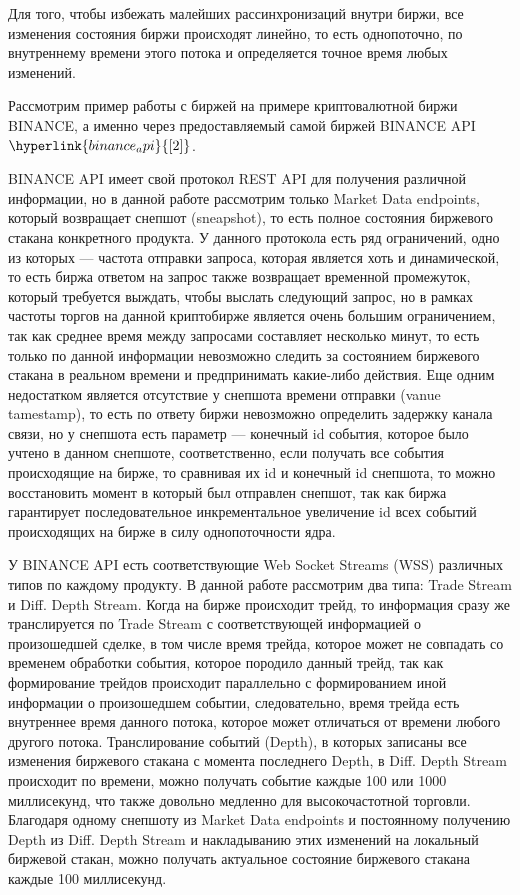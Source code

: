 \documentclass[12pt, a4paper]{article}
\begin{document}
Для того, чтобы избежать малейших рассинхронизаций внутри биржи, все изменения состояния биржи происходят линейно, то есть однопоточно, по внутреннему времени этого потока и определяется точное время любых изменений.

Рассмотрим пример работы с биржей на примере криптовалютной биржи \\ BINANCE, а именно через предоставляемый самой биржей BINANCE API $\hyperlink{binance_api}{[2]}$. 

BINANCE API имеет свой протокол REST API для получения различной информации, но в данной работе рассмотрим только Market Data endpoints, который возвращает снепшот (sneapshot), то есть полное состояния биржевого стакана конкретного продукта. У данного протокола есть ряд ограничений, одно из которых --- частота отправки запроса, которая является хоть и динамической, то есть биржа ответом на запрос также возвращает временной промежуток, который требуется выждать, чтобы выслать следующий запрос, но в рамках частоты торгов на данной криптобирже является очень большим ограничением, так как среднее время между запросами составляет несколько минут, то есть только по данной информации невозможно следить за состоянием биржевого стакана в реальном времени и предпринимать какие-либо действия. Еще одним недостатком является отсутствие у снепшота времени отправки (vanue tamestamp), то есть по ответу биржи невозможно определить задержку канала связи, но у снепшота есть параметр --- конечный id события, которое было учтено в данном снепшоте, соответственно, если получать все события происходящие на бирже, то сравнивая их id и конечный id снепшота, то можно восстановить момент в который был отправлен снепшот, так как биржа гарантирует последовательное инкрементальное увеличение id всех событий происходящих на бирже в силу однопоточности ядра.

У BINANCE API есть соответствующие Web Socket Streams (WSS) различных типов по каждому продукту. В данной работе рассмотрим два типа: Trade Stream и Diff. Depth Stream. Когда на бирже происходит трейд, то информация сразу же транслируется по Trade Stream с соответствующей информацией о произошедшей сделке, в том числе время трейда, которое может не совпадать со временем обработки события, которое породило данный трейд, так как формирование трейдов происходит параллельно с формированием иной информации о произошедшем событии, следовательно, время трейда есть внутреннее время данного потока, которое может отличаться от времени любого другого потока. Транслирование событий (Depth), в которых записаны все изменения биржевого стакана с момента последнего Depth, в Diff. Depth Stream происходит по времени, можно получать событие каждые 100 или 1000 миллисекунд, что также довольно медленно для высокочастотной торговли. Благодаря одному снепшоту из Market Data endpoints и постоянному получению Depth из Diff. Depth Stream и накладыванию этих изменений на локальный биржевой стакан, можно получать актуальное состояние биржевого стакана каждые 100 миллисекунд. 
\end{document}
